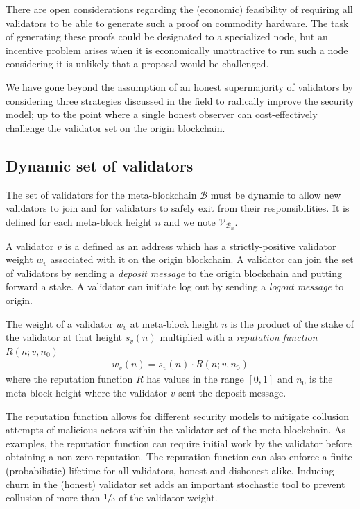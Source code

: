 \documentclass[12pt,a4paper]{article}
\begin{document}
There are open considerations regarding the (economic) feasibility of requiring all validators to be able to generate such a proof on commodity hardware.
The task of generating these proofs could be designated to a specialized node, but an incentive problem arises when it is economically unattractive to run such a node considering it is unlikely that a proposal would be challenged.

We have gone beyond the assumption of an honest supermajority of validators by considering three strategies discussed in the field to radically improve the security model; up to the point where a single honest observer can cost-effectively challenge the validator set on the origin blockchain.


\subsection{Dynamic set of validators}

The set of validators for the meta-blockchain $\mathcal{B}$ must be dynamic to allow new validators to join and for validators to safely exit from their responsibilities.
It is defined for each meta-block height $n$ and we note $\mathcal{V}_{\mathcal{B}_n}$.

A validator $v$ is a defined as an address which has a strictly-positive validator weight $w_v$ associated with it on the origin blockchain.
A validator can join the set of validators by sending a \emph{deposit message} to the origin blockchain and putting forward a stake.
A validator can initiate log out by sending a \emph{logout message} to origin.

The weight of a validator $w_v$ at meta-block height $n$ is the product of the stake of the validator at that height $s_v(n)$ multiplied with a \emph{reputation function} $R(n; v, n_0)$
\begin{align}
\label{validator_weights}
  w_v(n) = s_v(n) \cdot R(n; v, n_0)
\end{align}
where the reputation function $R$ has values in the range $[0,1]$ and $n_0$ is the meta-block height where the validator $v$ sent the deposit message.

The reputation function allows for different security models to mitigate collusion attempts of malicious actors within the validator set of the meta-blockchain.
As examples, the reputation function can require initial work by the validator before obtaining a non-zero reputation.
The reputation function can also enforce a finite (probabilistic) lifetime for all validators, honest and dishonest alike.
Inducing churn in the (honest) validator set adds an important stochastic tool to prevent collusion of more than $\sfrac{1}{3}$ of the validator weight.
\end{document}
